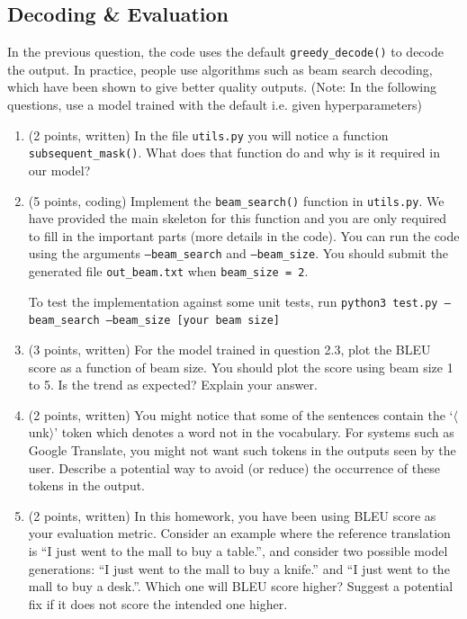 \documentclass{article}
\theoremstyle{case}
\theoremstyle{definition}
\begin{document}
\newpage
\subsection{Decoding \& Evaluation}

In the previous question, the code uses the default \texttt{greedy\_decode()} to decode the output.  In practice, people use algorithms such as beam search decoding, which have been shown to give better quality outputs. (Note: In the following questions, use a model trained with the default i.e. given hyperparameters)

\begin{enumerate}

    \item (2 points, written) In the file \texttt{utils.py} you will notice a function \texttt{subsequent\_mask()}. What does that function do and why is it required in our model?

    \newpage
    \item (5 points, coding) Implement the \texttt{beam\_search()} function in \texttt{utils.py}. We have provided the main skeleton for this function and you are only required to fill in the important parts (more details in the code). You can run the code using the arguments \texttt{--beam\_search} and \texttt{--beam\_size}. You should submit the generated file \texttt{out\_beam.txt} when \texttt{beam\_size = 2}.
    
    To test the implementation against some unit tests, run \texttt{python3 test.py --beam\_search --beam\_size [your beam size]}
    

    \newpage
    \item (3 points, written) For the model trained in question 2.3, plot the BLEU score as a function of beam size. You should plot the score using beam size 1 to 5. Is the trend as expected? Explain your answer.


    \newpage
    \item (2 points, written) You might notice that some of the sentences contain the `$\langle$unk$\rangle$' token which denotes a word not in the vocabulary. For systems such as Google Translate, you might not want such tokens in the outputs seen by the user. Describe a potential way to avoid (or reduce) the occurrence of these tokens in the output.


    \newpage
    \item (2 points, written) In this homework, you have been using BLEU score as your evaluation metric. Consider an example where the reference translation is ``I just went to the mall to buy a table.'', and consider two possible model generations: ``I just went to the mall to buy a knife.'' and ``I just went to the mall to buy a desk.''. Which one will BLEU score higher? Suggest a potential fix if it does not score the intended one higher.

    
\end{enumerate}
\end{document}
